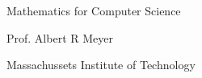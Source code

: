 \begin{center}
\begin{minipage}{4.5in}
\begin{center}
\rule{0in}{2in}
{\huge Mathematics for Computer Science}


\vspace{0.5in}

\Stamp

\vspace{1in}
{\LARGE Prof. Albert R Meyer}

{\large Massachussets Institute of Technology}

\end{center}

\end{minipage}
\end{center}
\coursecopyright

\tableofcontents

\endinput
